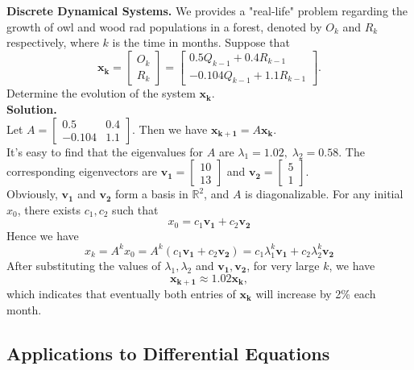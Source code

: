 \documentclass[10pt, a4paper]{article}
\newcommand{\R}{\mathbb{R}}
\newcommand{\vt}[1]{\mathbf{#1}}
\begin{document}
\begin{example}
    \textbf{Discrete Dynamical Systems.} We provides a "real-life" problem regarding the growth of owl and wood rad populations in a forest, denoted by $O_k$ and $R_k$ respectively, where $k$ is the time in months.
    Suppose that \[
    \vt{x_k}=\begin{bmatrix}
        O_k\\
        R_k
    \end{bmatrix}
    = \begin{bmatrix}
        0.5Q_{k-1} + 0.4R_{k-1}\\
        -0.104Q_{k-1} + 1.1R_{k-1}
    \end{bmatrix}.
    \]
    Determine the evolution of the system $\vt{x_k}$.\\
    \textbf{Solution.} \\
    Let $A=\begin{bmatrix}
        0.5&0.4\\
        -0.104&1.1
    \end{bmatrix}$. Then we have $\vt{x_{k+1}}=A\vt{x_k}$.\\
    It's easy to find that the eigenvalues for $A$ are $\lambda_1=1.02,\;\lambda_2=0.58$. The corresponding eigenvectors are $\vt{v_1}=\begin{bmatrix}
        10\\
        13
    \end{bmatrix}$ and $\vt{v_2}=\begin{bmatrix}
        5\\
        1
    \end{bmatrix}$.\\
    Obviously, $\vt{v_1}$ and $\vt{v_2}$ form a basis in $\R^2$, and $A$ is diagonalizable. For any initial $x_0$, there exists $c_1,c_2$ such that \[
    x_0=c_1\vt{v_1}+c_2\vt{v_2}
    \]
    Hence we have \[
    x_k = A^k x_0 = A^k(c_1\vt{v_1}+c_2\vt{v_2}) = c_1\lambda_1^k\vt{v_1}+c_2\lambda_2^k\vt{v_2}
    \]
    After substituting the values of $\lambda_1,\lambda_2$ and $\vt{v_1},\vt{v_2}$, for very large $k$, we have \[
    \vt{x_{k+1}}\approx 1.02 \vt{x_k},
    \]
    which indicates that eventually both entries of $\vt{x_k}$ will increase by 2\% each month.
\end{example}

\subsection{Applications to Differential Equations}
\end{document}
